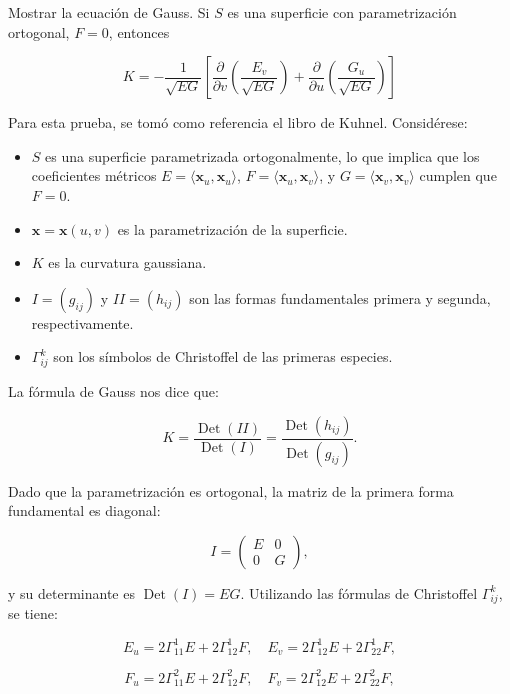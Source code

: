 \begin{problema}
    Mostrar la ecuación de Gauss. Si $S$ es una superficie con parametrización ortogonal, $F=0$, entonces

$$
K=-\frac{1}{\sqrt{E G}}\left[\frac{\partial}{\partial v}\left(\frac{E_{v}}{\sqrt{E G}}\right)+\frac{\partial}{\partial u}\left(\frac{G_{u}}{\sqrt{E G}}\right)\right]
$$

\begin{dem}
    Para esta prueba, se tomó como referencia el libro de Kuhnel. Considérese: 
    \begin{itemize}
        \item $S$ es una superficie parametrizada ortogonalmente, lo que implica que los coeficientes métricos $E = \langle \mathbf{x}_u, \mathbf{x}_u \rangle$, $F = \langle \mathbf{x}_u, \mathbf{x}_v \rangle$, y $G = \langle \mathbf{x}_v, \mathbf{x}_v \rangle$ cumplen que $F = 0$.
        \item $\mathbf{x} = \mathbf{x}(u, v)$ es la parametrización de la superficie.
        \item $K$ es la curvatura gaussiana.
        \item $I = (g_{ij})$ y $II = (h_{ij})$ son las formas fundamentales primera y segunda, respectivamente.
        \item $\Gamma_{ij}^k$ son los símbolos de Christoffel de las primeras especies.
        
    \end{itemize}

La fórmula de Gauss nos dice que:

$$
K = \frac{\operatorname{Det}(II)}{\operatorname{Det}(I)} = \frac{\operatorname{Det}(h_{ij})}{\operatorname{Det}(g_{ij})}.
$$

Dado que la parametrización es ortogonal, la matriz de la primera forma fundamental es diagonal:

$$
I = \begin{pmatrix} E & 0 \\ 0 & G \end{pmatrix},
$$

y su determinante es $\operatorname{Det}(I) = EG$. Utilizando las fórmulas de Christoffel $\Gamma_{ij}^k$, se tiene:

$$
E_u = 2\Gamma_{11}^1 E + 2\Gamma_{12}^1 F, \quad E_v = 2\Gamma_{12}^1 E + 2\Gamma_{22}^1 F,
$$

$$
F_u = 2\Gamma_{11}^2 E + 2\Gamma_{12}^2 F, \quad F_v = 2\Gamma_{12}^2 E + 2\Gamma_{22}^2 F,
$$


\end{dem}
\end{problema}
